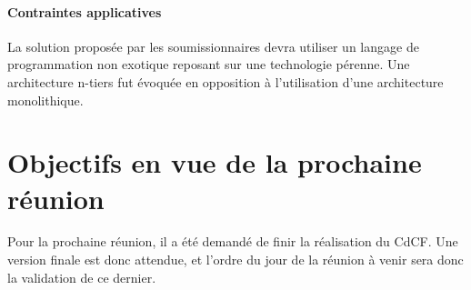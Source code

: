 \documentclass[11pt,fleqn]{report}
\begin{document}
\paragraph{Contraintes applicatives}
La solution proposée par les soumissionnaires devra utiliser un langage de programmation non exotique reposant sur une technologie pérenne. Une architecture n-tiers fut évoquée en opposition à l'utilisation d'une architecture monolithique.

\section{Objectifs en vue de la prochaine réunion}
Pour la prochaine réunion, il a été demandé de finir la réalisation du CdCF. Une version finale est donc attendue, et l'ordre du jour de la réunion à venir sera donc la validation de ce dernier.
\end{document}
